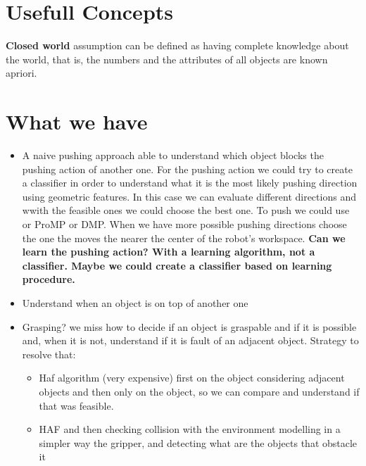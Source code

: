 \section{Usefull Concepts}
 \textbf{Closed world} assumption \citep{Reiter87} can be defined
as having complete knowledge about the world, that is, the numbers and the attributes
of all objects are known apriori. 
\fi


\iffalse
\section{What we have}
\begin{itemize}
\item A naive pushing approach able to understand which object blocks the pushing action of another one.
For the pushing action we could try to create a classifier in order to understand what it is the most likely pushing direction using geometric features. In this case we can evaluate different directions and wwith the feasible ones we could choose the best one. 
To push we could use or ProMP or DMP. When we have more possible pushing directions choose the one the moves the nearer the center of the robot's workspace.
\textbf{Can we learn the pushing action? With a learning algorithm, not a classifier. Maybe we could create a classifier based on learning procedure.}
\item Understand when an object is on top of another one
\item Grasping? we miss how to decide if an object is graspable and if it is possible and, when it is not, understand if it is fault of an adjacent object. 
Strategy to resolve that:
\begin{itemize}
\item Haf algorithm (very expensive) first on the object considering adjacent objects and then only on the object, so we can compare and understand if that was feasible. 
\item HAF and then checking collision with the environment modelling in a simpler way the gripper, and detecting what are the objects that obstacle it


\end{itemize}
\end{itemize}

